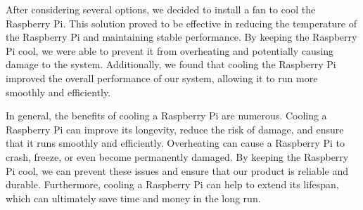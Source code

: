 After considering several options, we decided to install a fan to cool the Raspberry Pi. This solution proved to be effective in reducing the temperature of the Raspberry Pi and maintaining stable performance. By keeping the Raspberry Pi cool, we were able to prevent it from overheating and potentially causing damage to the system. Additionally, we found that cooling the Raspberry Pi improved the overall performance of our system, allowing it to run more smoothly and efficiently.

In general, the benefits of cooling a Raspberry Pi are numerous. Cooling a Raspberry Pi can improve its longevity, reduce the risk of damage, and ensure that it runs smoothly and efficiently. Overheating can cause a Raspberry Pi to crash, freeze, or even become permanently damaged. By keeping the Raspberry Pi cool, we can prevent these issues and ensure that our product is reliable and durable. Furthermore, cooling a Raspberry Pi can help to extend its lifespan, which can ultimately save time and money in the long run.


%




%